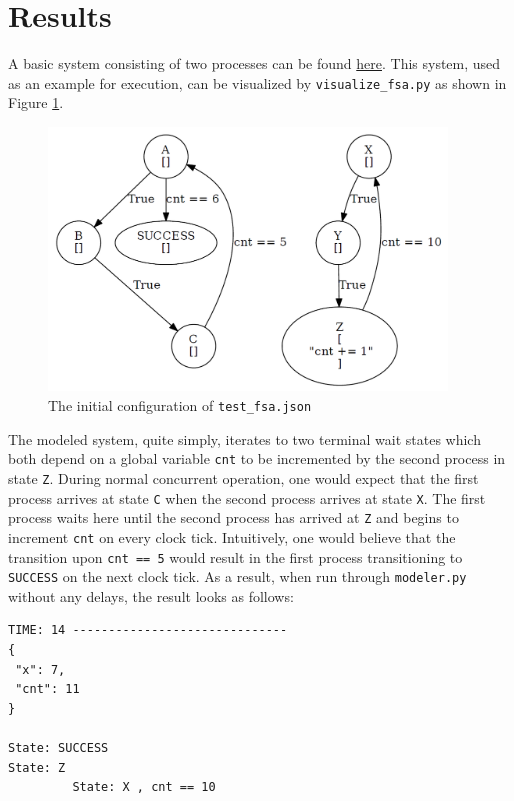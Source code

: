 \documentclass[12pt]{extarticle}
\begin{document}
\section{Results}
A basic system consisting of two processes can be found \href{https://github.com/brian-rieder/clock-error-modeler/blob/master/test_fsa.json}{here}. This system, used as an example for execution, can be visualized by \verb|visualize_fsa.py| as shown in Figure \ref{fig:initviz}.\\

\begin{figure}[!htbp]
  \begin{center}
  \includegraphics[width=300pt]{./initial.png}
  \end{center}
  \caption{The initial configuration of \texttt{test\_fsa.json}}
  \label{fig:initviz}
\end{figure}

The modeled system, quite simply, iterates to two terminal wait states which both depend on a global variable \texttt{cnt} to be incremented by the second process in state \texttt{Z}. During normal concurrent operation, one would expect that the first process arrives at state \texttt{C} when the second process arrives at state \texttt{X}. The first process waits here until the second process has arrived at \texttt{Z} and begins to increment \texttt{cnt} on every clock tick. Intuitively, one would believe that the transition upon \verb|cnt == 5| would result in the first process transitioning to \texttt{SUCCESS} on the next clock tick. As a result, when run through \texttt{modeler.py} without any delays, the result looks as follows:
\begin{verbatim}
TIME: 14 ------------------------------
{
 "x": 7,
 "cnt": 11
}

State: SUCCESS
State: Z
         State: X , cnt == 10
\end{verbatim}
\end{document}
